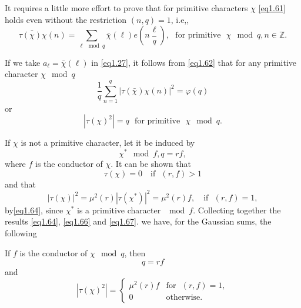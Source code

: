 It requires a little more effort to prove that for primitive
characters $\chi$ \eqref{eq1.61}  holds even without the restriction
$(n,q)=1$, i.e,, 
\begin{equation*}%
\tau\bar{(\chi)}\chi(n) = \sum_{\ell \mod q} \bar{\chi}(\ell)
e(n\frac{\ell}{q}), \text{~ for primitive~ } \chi \mod q, n \in
\mathbb{Z}. \tag{1.62}\label{eq1.62} 
\end{equation*}

If we take $a_\ell = \bar{\chi}(\ell)$ in \eqref{eq1.27}, it follows from
\eqref{eq1.62} that for any primitive character $\chi \mod q$ 
\begin{equation*}%
\frac{1}{q}\sum_{n=1}^{q}|\tau (\bar{\chi})\chi(n)|^2=\varphi(q)
\tag{1.63}\label{eq1.63} 
\end{equation*}
or 
\begin{equation*}%
|\tau (\chi)^2|=q \text{~  for primitive~ } \chi \mod
q.\tag{1.64}\label{eq1.64} 
\end{equation*}

If $\chi$ is not a primitive character, let it be induced by 
\begin{equation*}%
\chi^* \mod f, q=rf, \tag{1.65}\label{eq1.65}
\end{equation*}
where $f$ is the conductor of $\chi$. It can be shown that 
\begin{equation*}%
\tau (\chi) =0 \quad \text{if~ } (r,f) >1 \tag{1.66}\label{eq1.66}
\end{equation*}
and that 
\begin{equation*} %
|\tau (\chi)|^2 = \mu^2(r) |\tau (\chi^*)|^2= \mu^2(r) f,\quad
\text{if~ } (r, f) =1,\tag{1.67}\label{eq1.67} 
\end{equation*} 
by\pageoriginale \eqref{eq1.64}, since $\chi^*$ is a primitive
character $\mod f$. Collecting together the results \eqref{eq1.64},
\eqref{eq1.66} 
and \eqref{eq1.67}. we have, for the Gaussian sums, the following  

\setcounter{section}{1}
\setcounter{lemma}{0}
\begin{lemma}\label{chap1-lem1.1} %
If $f$ is the conductor of $\chi \mod q$, then 
\begin{equation*}
q=rf \tag{1.68}\label{eq1.68}
\end{equation*}
and
\begin{equation*}
|\tau(\chi)^2 |= 
\begin{cases} 
\mu^2 (r)f  & \text{for~ } (r,f) =1,\\
0 & \text{otherwise}. 
\end{cases} \tag{1.69}\label{eq1.69}
\end{equation*}
\end{lemma}

